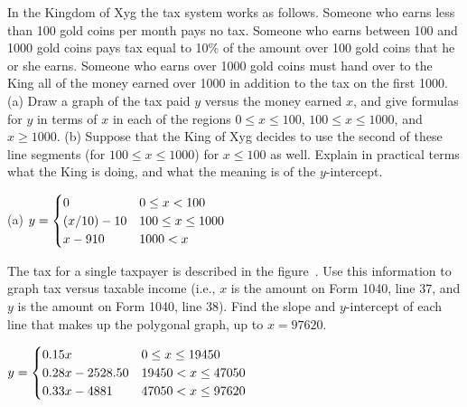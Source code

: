 \begin{exercises}
\exercise
In the Kingdom of Xyg the tax system works as follows.  Someone who
earns less than 100 gold coins per month pays no tax.  Someone who earns
between 100 and 1000 gold coins pays tax equal to 10\% of the amount over
100 gold coins that he or she earns.  Someone who earns over 1000 gold coins
must hand over to the King all of the money earned over 1000 in addition to
the tax on the first 1000.  (a) Draw a
graph of the tax paid $y$ versus the money earned $x$, and give
formulas for $y$ in terms of $x$ in each of the regions $0\le x\le 100$,
$100\le x\le 1000$, and $x\ge 1000$.  (b) Suppose that the King of Xyg
decides to use the second of these line segments (for $100\le x\le 1000$)
for $x\le 100$ as well.  Explain in practical terms what the King is doing,
and what the meaning is of the $y$-intercept. 
\begin{answer} (a) $\displaystyle y=\begin{cases} 0 & 0\le x<100 \\
(x/10)-10& 100\le x\le 1000 \\
x-910 & 1000<x 
\end{cases}$
\end{answer}

\exercise
The tax for a single taxpayer is described in the
figure~. Use this
information to graph tax versus taxable income (i.e., $x$ is the
amount on Form 1040, line 37, and $y$ is the amount on Form 1040, line 38).
Find the slope and $y$-intercept of each line that makes up the polygonal
graph, up to $x=97620$.
\begin{answer} $\displaystyle y=\begin{cases} 0.15x & 0\le x\le 19450 \\
0.28x-2528.50&  19450<x\le 47050 \\
0.33x-4881 & 47050<x\le 97620 \\
\end{cases}$
\end{answer}



\end{exercises}
